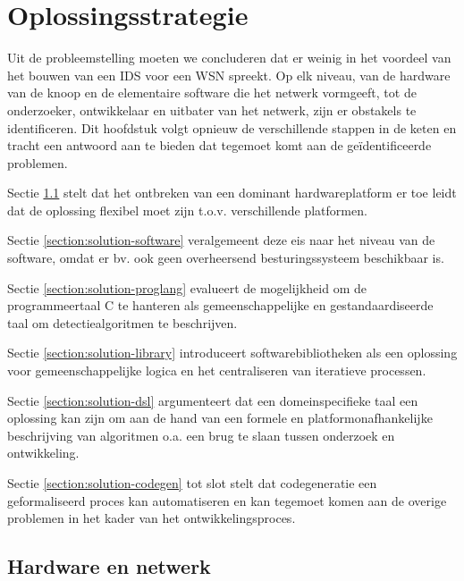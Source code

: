 
\chapter{Oplossingsstrategie}
\label{chapter:oplossingsstrategie}

Uit de probleemstelling moeten we concluderen dat er weinig in het voordeel van
het bouwen van een IDS voor een WSN spreekt. Op elk niveau, van de hardware van
de knoop en de elementaire software die het netwerk vormgeeft, tot de
onderzoeker, ontwikkelaar en uitbater van het netwerk, zijn er obstakels te
identificeren. Dit hoofdstuk volgt opnieuw de verschillende stappen in de keten
en tracht een antwoord aan te bieden dat tegemoet komt aan de
ge\"identificeerde problemen.

Sectie \ref{section:solution-node-wsn} stelt dat het ontbreken van een dominant
hardwareplatform er toe leidt dat de oplossing flexibel moet zijn t.o.v.
verschillende platformen.

Sectie \ref{section:solution-software} veralgemeent deze eis naar het niveau
van de software, omdat er bv. ook geen overheersend besturingssysteem
beschikbaar is.

Sectie \ref{section:solution-proglang} evalueert de mogelijkheid om de
programmeertaal C te hanteren als gemeenschappelijke en gestandaardiseerde taal
om detectiealgoritmen te beschrijven.

Sectie \ref{section:solution-library} introduceert softwarebibliotheken als een
oplossing voor gemeenschappelijke logica en het centraliseren van iteratieve
processen.

Sectie \ref{section:solution-dsl} argumenteert dat een domeinspecifieke taal
een oplossing kan zijn om aan de hand van een formele en platformonafhankelijke
beschrijving van algoritmen o.a. een brug te slaan tussen onderzoek en
ontwikkeling.

Sectie \ref{section:solution-codegen} tot slot stelt dat codegeneratie een
geformaliseerd proces kan automatiseren en kan tegemoet komen aan de overige
problemen in het kader van het ontwikkelingsproces.

\vspace{-3mm}

\section{Hardware en netwerk}
\label{section:solution-node-wsn}

